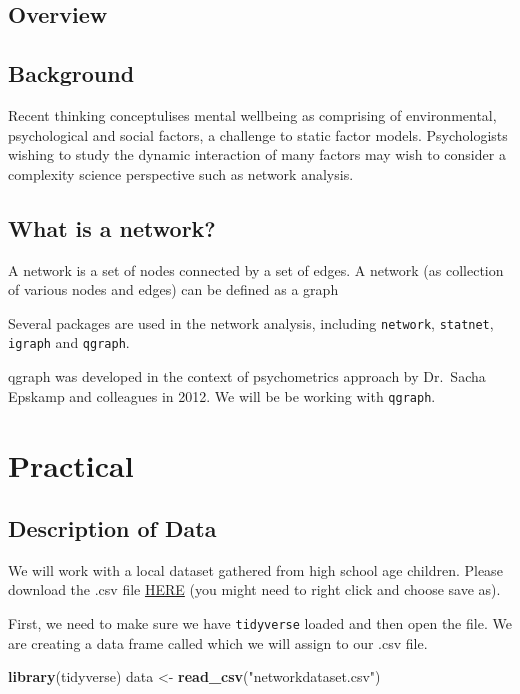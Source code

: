 \documentclass[]{book}
\newenvironment{Shaded}{\begin{snugshade}}{\end{snugshade}}
\newcommand{\KeywordTok}[1]{\textcolor[rgb]{0.13,0.29,0.53}{\textbf{#1}}}
\newcommand{\StringTok}[1]{\textcolor[rgb]{0.31,0.60,0.02}{#1}}
\newcommand{\NormalTok}[1]{#1}
\begin{document}
\section{Overview}\label{overview-3}

\section{Background}\label{background}

Recent thinking conceptulises mental wellbeing as comprising of
environmental, psychological and social factors, a challenge to static
factor models. Psychologists wishing to study the dynamic interaction of
many factors may wish to consider a complexity science perspective such
as network analysis.

\section{What is a network?}\label{what-is-a-network}

A network is a set of nodes connected by a set of edges. A network (as
collection of various nodes and edges) can be defined as a graph

Several packages are used in the network analysis, including
\texttt{network}, \texttt{statnet}, \texttt{igraph} and \texttt{qgraph}.

qgraph was developed in the context of psychometrics approach by
Dr.~Sacha Epskamp and colleagues in 2012. We will be be working with
\texttt{qgraph}.

\chapter{Practical}\label{practical}

\section{Description of Data}\label{description-of-data}

We will work with a local dataset gathered from high school age
children. Please download the .csv file
\href{data/networkdataset.csv}{HERE} (you might need to right click and
choose save as).

First, we need to make sure we have \texttt{tidyverse} loaded and then
open the file. We are creating a data frame called which we will assign
to our .csv file.

\begin{Shaded}
\begin{Highlighting}[]
\KeywordTok{library}\NormalTok{(tidyverse)}
\NormalTok{data <-}\StringTok{ }\KeywordTok{read_csv}\NormalTok{(}\StringTok{"networkdataset.csv"}\NormalTok{)}
\end{Highlighting}
\end{Shaded}
\end{document}
